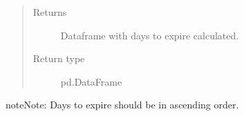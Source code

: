 \documentclass[letterpaper,10pt,english]{sphinxmanual}
\begin{document}
\begin{fulllineitems}
\begin{quote}
\begin{description}
\item[{Returns}] \leavevmode
{} \textendash{} Dataframe with days to expire calculated.

\item[{Return type}] \leavevmode
pd.DataFrame

\end{description}\end{quote}

\begin{sphinxadmonition}{note}{Note:}
Days to expire should be in ascending order.
\end{sphinxadmonition}

\end{fulllineitems}

\end{document}
